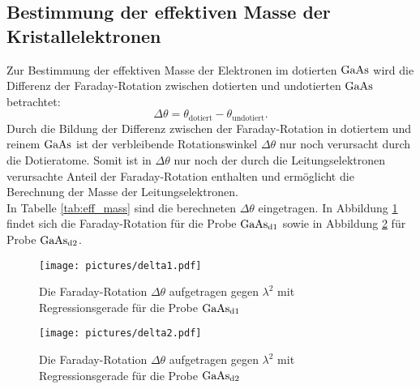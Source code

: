 \subsection{Bestimmung der effektiven Masse der Kristallelektronen}
Zur Bestimmung der effektiven Masse der Elektronen im dotierten $\ce{GaAs}$ wird die Differenz der Faraday-Rotation zwischen dotierten und undotierten $\ce{GaAs}$ betrachtet:
\begin{equation}
\Delta \theta=\theta_{\mathrm{dotiert}}-\theta_{\mathrm{undotiert}}\mathrm{.}
\end{equation}
Durch die Bildung der Differenz zwischen der Faraday-Rotation in dotiertem und reinem $\ce{GaAs}$ ist der verbleibende Rotationswinkel $\Delta\theta$ nur noch verursacht durch die Dotieratome.
Somit ist in $\Delta\theta$ nur noch der durch die Leitungselektronen verursachte Anteil der Faraday-Rotation enthalten und ermöglicht die Berechnung der Masse der Leitungselektronen.\\
In Tabelle \ref{tab:eff_mass} sind die berechneten $\Delta\theta$ eingetragen. In Abbildung \ref{fig:delta1} findet sich die Faraday-Rotation für die Probe $\ce{GaAs}_{\mathrm{d1}}$ sowie in Abbildung \ref{fig:delta2}
für Probe $\ce{GaAs}_{\mathrm{d2}}$.

\begin{figure}
  \centering
  \texttt{[image: pictures/delta1.pdf]}
  \caption{Die Faraday-Rotation $\Delta \theta$ aufgetragen gegen $\lambda^{2}$ mit Regressionsgerade für die Probe $\ce{GaAs}_{\mathrm{d1}}$}
  \label{fig:delta1}
\end{figure}
\begin{figure}
  \centering
  \texttt{[image: pictures/delta2.pdf]}
  \caption{Die Faraday-Rotation $\Delta \theta$ aufgetragen gegen $\lambda^{2}$ mit Regressionsgerade für die Probe $\ce{GaAs}_{\mathrm{d2}}$}
  \label{fig:delta2}
\end{figure}

